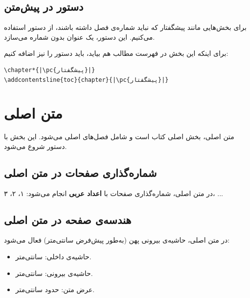 \subsection{دستور  در پیش‌متن}
\label{sec:book-structure-chapter-star}

برای بخش‌هایی مانند پیشگفتار که نباید شماره‌ی
فصل داشته باشند، از دستور  استفاده
می‌کنیم. این دستور، یک عنوان بدون شماره می‌سازد.

برای اینکه این بخش در فهرست مطالب هم بیاید،
باید دستور  را نیز اضافه
کنیم:

\begin{latin}
\begin{verbatim}
\chapter*{|\pc{پیشگفتار}|}
\addcontentsline{toc}{chapter}{|\pc{پیشگفتار}|}
\end{verbatim}
\end{latin}


\section{متن اصلی}
\label{sec:book-structure-mainmatter}

متن اصلی، بخش اصلی کتاب است و شامل فصل‌های
اصلی می‌شود. این بخش با دستور 
شروع می‌شود.

\subsection{شماره‌گذاری صفحات در متن اصلی}
\label{sec:book-structure-mainmatter-numbering}

در متن اصلی، شماره‌گذاری صفحات با \textbf{اعداد
عربی} انجام می‌شود: ۱، ۲، ۳، ...

\subsection{هندسه‌ی صفحه در متن اصلی}
\label{sec:book-structure-mainmatter-geometry}

در متن اصلی، حاشیه‌ی بیرونی پهن (به‌طور پیش‌فرض
 سانتی‌متر) فعال می‌شود:

\begin{itemize}
    \item حاشیه‌ی داخلی:  سانتی‌متر.
    \item حاشیه‌ی بیرونی:  سانتی‌متر.
    \item عرض متن: حدود  سانتی‌متر.
\end{itemize}

